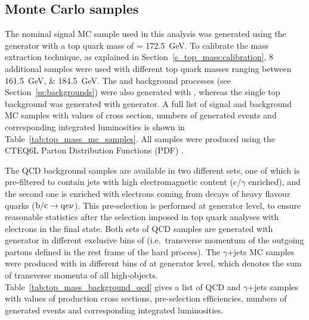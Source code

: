 

\subsection{Monte Carlo samples}
\label{ss_top_mass:mc_samples}

The nominal signal \ttbar MC sample used in this analysis was generated using the \MADGRAPH generator with a top quark
mass of \mtop = \SI{172.5}{\GeV}. To calibrate the mass extraction technique, as explained in
Section~\ref{s_top_mass:calibration}, 8 additional \ttbar samples were used with different top quark masses ranging
between \SIlist{161.5;184.5}{\GeV}. The \WpJets and \ZpJets background processes (see Section~\ref{ss:backgrounds}) were
also generated with \MADGRAPH, whereas the single top background was generated with \POWHEG generator. A full list of
signal \ttbar and background MC samples with values of cross section, numbers of generated events and corresponding
integrated luminosities is shown in Table~\ref{tab:top_mass_mc_samples}. All samples were produced using the CTEQ6L
Parton Distribution Functions (PDF) \autocite{CTEQ}.

The QCD background samples are available in two different sets, one of which is pre-filtered to contain jets with high
electromagnetic content ($e/\gamma$ enriched), and the second one is enriched with electrons coming from decays of heavy
flavour quarks ($\mathrm{b}/\mathrm{c} \rightarrow \mathrm{q} e\nu$). This pre-selection is performed at generator level, to ensure
reasonable statistics after the \ttbar selection imposed in top quark analyses with electrons in the final state. Both
sets of QCD samples are generated with \PYTHIA generator in different exclusive bins of \pthat (i.e.\ transverse
momentum of the outgoing partons defined in the rest frame of the hard process). The $\gamma$+jets MC samples were
produced with \MADGRAPH in different bins of \HT at generator level, which denotes the sum of transverse momenta of all
high-\pt objects. Table~\ref{tab:top_mass_background_qcd} gives a list of QCD and $\gamma$+jets samples with values of
production cross sections, pre-selection efficiencies, numbers of generated events and corresponding integrated
luminosities.

